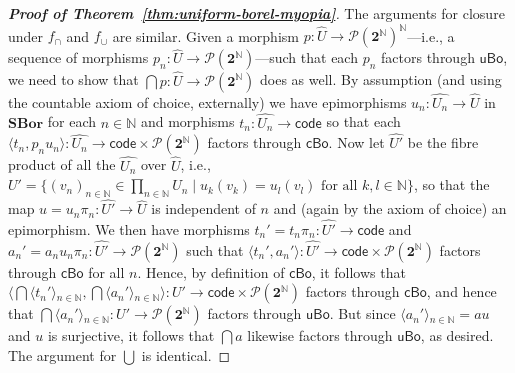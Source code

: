 \documentclass[11pt]{amsart}
\newcommand\br[1]{\langle{}#1\rangle{}}
\newcommand\cBo{\mathsf{cBo}}
\newcommand\code{\mathsf{code}}
\newcommand\FORALL{\text{ for all }}
\newcommand{\N}{\mathbb{N}}
\newcommand\pow{\mathcal{P}}
\newcommand\SBor{\mathbf{SBor}}
\newcommand\set[2][]{#1\{{#2}#1\}}
\newcommand\two{\mathbf{2}}
\newcommand\uBo{\mathsf{uBo}}
\newcommand\wh[1]{\widehat{#1}}
\theoremstyle{definition}
\theoremstyle{remark}
\theoremstyle{plain}
\begin{document}
\begin{proof}[\textbf{\textup{Proof of Theorem~\ref{thm:uniform-borel-myopia}}}]
  The arguments for closure under \( f_\cap \) and \( f_\cup \) are similar.
  Given a morphism \( p \colon \wh U \to \pow(\two^\N)^\N \)---i.e., a sequence of morphisms \( p_n \colon \wh U \to \pow(\two^\N) \)---such that each \( p_n \) factors through \( \uBo \), we need to show that \( \bigcap p \colon \wh U \to \pow(\two^\N) \) does as well.
  By assumption (and using the countable axiom of choice, externally) we have epimorphisms \( u_n \colon \wh{U_n} \to \wh U \) in \( \SBor \) for each \( n \in \N \) and morphisms \( t_n \colon \wh{U_n} \to \code \) so that each \( \br{t_n, p_n u_n} \colon \wh{U_n} \to \code \times \pow(\two^\N) \) factors through \( \cBo \).
  Now let \( \wh{U'} \) be the fibre product of all the \( \wh{U_n} \) over \( \wh U \), i.e., \( U' = \set{(v_n)_{n \in \N} \in \prod_{n \in \N} U_n \mid u_k(v_k) = u_l(v_l) \FORALL k,l \in \N} \), so that the map \( u = u_n \pi_n \colon \wh{U'} \to \wh U \) is independent of \( n \) and (again by the axiom of choice) an epimorphism.
  We then have morphisms \( t_n' = t_n \pi_n \colon \wh{U'} \to \code \) and \( a_n' = a_n u_n \pi_n \colon \wh{U'} \to \pow(\two^\N) \) such that \( \br{t_n', a_n'} \colon \wh{U'} \to \code \times \pow(\two^\N) \) factors through \( \cBo \) for all \( n \).
  Hence, by definition of \( \cBo \), it follows that \( \br{ \bigcap \br{t_n'}_{n \in \N}, \bigcap \br{a_n'}_{n \in \N} } \colon U' \to \code \times \pow(\two^\N) \) factors through \( \cBo \), and hence that \( \bigcap \br{a_n'}_{n \in \N} \colon U' \to \pow(\two^\N) \) factors through \( \uBo \).
  But since \( \br{a_n'}_{n \in \N} = a u \) and \( u \) is surjective, it follows that \( \bigcap a \) likewise factors through \( \uBo \), as desired.
  The argument for \( \bigcup \) is identical.
\end{proof}
\end{document}
